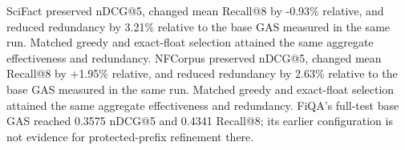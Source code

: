 SciFact preserved nDCG@5, changed mean Recall@8 by -0.93\% relative, and reduced redundancy by 3.21\% relative to the base GAS measured in the same run. Matched greedy and exact-float selection attained the same aggregate effectiveness and redundancy. NFCorpus preserved nDCG@5, changed mean Recall@8 by +1.95\% relative, and reduced redundancy by 2.63\% relative to the base GAS measured in the same run. Matched greedy and exact-float selection attained the same aggregate effectiveness and redundancy. FiQA's full-test base GAS reached 0.3575 nDCG@5 and 0.4341 Recall@8; its earlier configuration is not evidence for protected-prefix refinement there.
